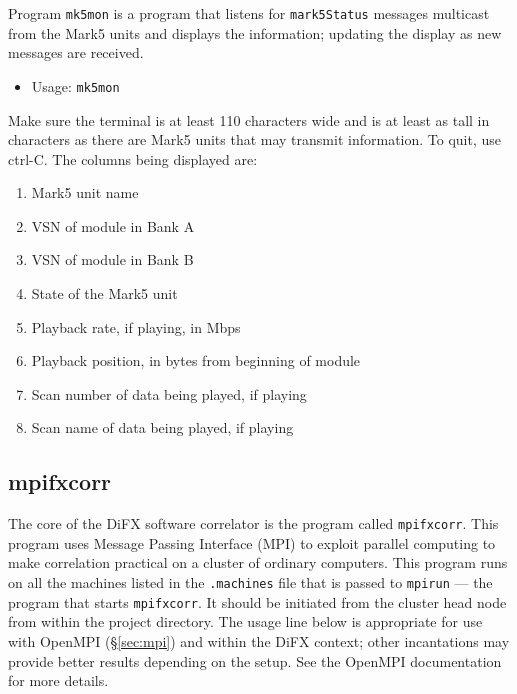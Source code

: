 Program {\tt mk5mon} is a program that listens for {\tt mark5Status} messages multicast from the Mark5 units and displays the information; updating the display as new messages are received.

\begin{itemize}
\item[] Usage: {\tt mk5mon}
\end{itemize}

Make sure the terminal is at least 110 characters wide and is at least as tall in characters as there are Mark5 units that may transmit information.
To quit, use ctrl-C.
The columns being displayed are:
\begin{enumerate}
\item Mark5 unit name
\item VSN of module in Bank A
\item VSN of module in Bank B
\item State of the Mark5 unit
\item Playback rate, if playing, in Mbps
\item Playback position, in bytes from beginning of module
\item Scan number of data being played, if playing
\item Scan name of data being played, if playing
\end{enumerate}








\subsection{mpifxcorr} \label{sec:mpifxcorr}

The core of the DiFX software correlator is the program called {\tt mpifxcorr}.
This program uses Message Passing Interface (MPI) to exploit parallel computing to make correlation practical on a cluster of ordinary computers.
This program runs on all the machines listed in the {\tt .machines} file that is passed to {\tt mpirun} --- the program that starts {\tt mpifxcorr}.
It should be initiated from the cluster head node from within the project directory.
The usage line below is appropriate for use with OpenMPI (\S\ref{sec:mpi}) and within the DiFX context; other incantations may provide better results depending on the setup.
See the OpenMPI documentation for more details.

